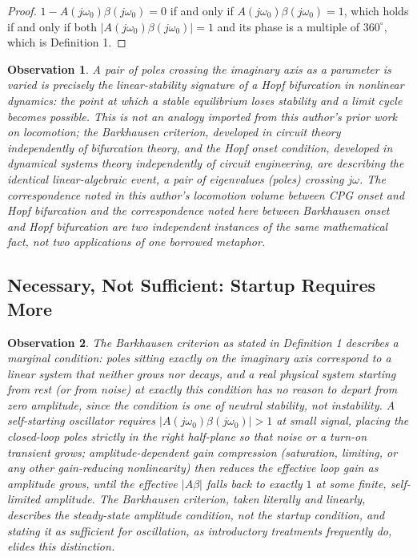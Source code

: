 \documentclass[12pt]{article}
\newtheorem{observation}{Observation}
\begin{document}
\begin{proof}
$1 - A(j\omega_0)\beta(j\omega_0) = 0$ if and only if $A(j\omega_0)\beta(j\omega_0) = 1$, which holds if and only if both $|A(j\omega_0)\beta(j\omega_0)| = 1$ and its phase is a multiple of $360^\circ$, which is Definition 1.
\end{proof}

\begin{observation}
A pair of poles crossing the imaginary axis as a parameter is varied is precisely the linear-stability signature of a Hopf bifurcation in nonlinear dynamics: the point at which a stable equilibrium loses stability and a limit cycle becomes possible. This is not an analogy imported from this author's prior work on locomotion; the Barkhausen criterion, developed in circuit theory independently of bifurcation theory, and the Hopf onset condition, developed in dynamical systems theory independently of circuit engineering, are describing the identical linear-algebraic event, a pair of eigenvalues (poles) crossing $j\omega$. The correspondence noted in this author's locomotion volume between CPG onset and Hopf bifurcation and the correspondence noted here between Barkhausen onset and Hopf bifurcation are two independent instances of the same mathematical fact, not two applications of one borrowed metaphor.
\end{observation}

\subsection{Necessary, Not Sufficient: Startup Requires More}

\begin{observation}
The Barkhausen criterion as stated in Definition 1 describes a marginal condition: poles sitting exactly on the imaginary axis correspond to a linear system that neither grows nor decays, and a real physical system starting from rest (or from noise) at exactly this condition has no reason to depart from zero amplitude, since the condition is one of neutral stability, not instability. A self-starting oscillator requires $|A(j\omega_0)\beta(j\omega_0)| > 1$ at small signal, placing the closed-loop poles strictly in the right half-plane so that noise or a turn-on transient grows; amplitude-dependent gain compression (saturation, limiting, or any other gain-reducing nonlinearity) then reduces the effective loop gain as amplitude grows, until the effective $|A\beta|$ falls back to exactly $1$ at some finite, self-limited amplitude. The Barkhausen criterion, taken literally and linearly, describes the steady-state amplitude condition, not the startup condition, and stating it as sufficient for oscillation, as introductory treatments frequently do, elides this distinction.
\end{observation}
\end{document}
